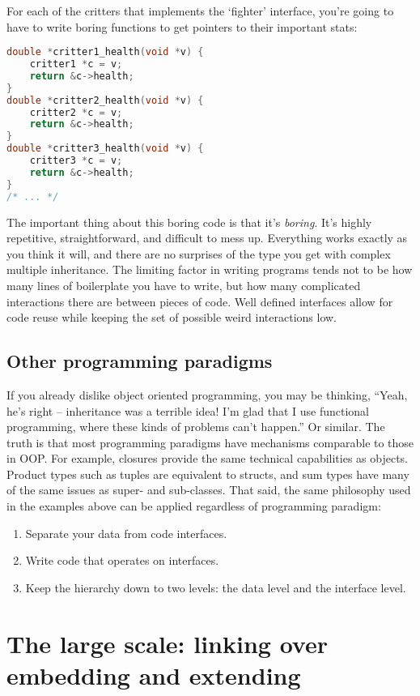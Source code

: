 \documentclass[12pt]{article}
\begin{document}
For each of the critters that implements the `fighter' interface, you're going to have to
write boring functions to get pointers to their important stats:

\begin{lstlisting}[language=C]
double *critter1_health(void *v) {
    critter1 *c = v;
    return &c->health;
}
double *critter2_health(void *v) {
    critter2 *c = v;
    return &c->health;
}
double *critter3_health(void *v) {
    critter3 *c = v;
    return &c->health;
}
/* ... */
\end{lstlisting}

The important thing about this boring code is that it's \textit{boring}. It's
highly repetitive, straightforward, and difficult to mess up. Everything works
exactly as you think it will, and there are no surprises of the type you get
with complex multiple inheritance. The limiting factor in writing programs tends
not to be how many lines of boilerplate you have to write, but how many complicated
interactions there are between pieces of code. Well defined interfaces allow for
code reuse while keeping the set of possible weird interactions low.

\subsection{Other programming paradigms}

If you already dislike object oriented programming, you may be thinking,
``Yeah, he's right -- inheritance was a terrible idea! I'm glad that I use
functional programming, where these kinds of problems can't happen.'' Or
similar. The truth is that most programming paradigms have mechanisms
comparable to those in OOP. For example, closures provide the same technical
capabilities as objects. Product types such as tuples are equivalent to structs,
and sum types have many of the same issues as super- and sub-classes.
That said, the same philosophy used in the examples above can be applied regardless
of programming paradigm:

\begin{enumerate}
    \item Separate your data from code interfaces.
    \item Write code that operates on interfaces.
    \item Keep the hierarchy down to two levels: the data level and the interface level.
\end{enumerate}

\section{The large scale: linking over embedding and extending}
\end{document}
